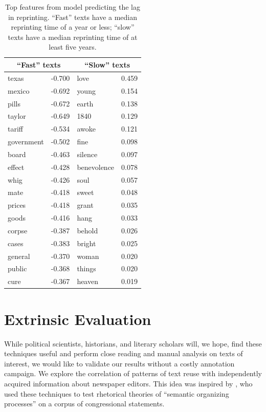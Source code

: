 \documentclass[pdftex,11pt]{article}
\begin{document}
\begin{table}
  \small
  \centering
  \caption{Top features from model predicting the lag in
    reprinting.  ``Fast'' texts have a median reprinting time of a
    year or less; ``slow'' texts have a median reprinting time of at
    least five years.}
  \label{tab:lag-features}
  \begin{tabular}{l r|l r}
\multicolumn{2}{c|}{``Fast'' texts} &
\multicolumn{2}{c}{``Slow'' texts} \\ \hline
texas & -0.700 & love & 0.459\\
mexico & -0.692 & young & 0.154\\
pills & -0.672 & earth & 0.138\\
taylor & -0.649 & 1840 & 0.129\\
tariff & -0.534 & awoke & 0.121\\
government & -0.502 & fine & 0.098\\
board & -0.463 & silence & 0.097\\
effect & -0.428 & benevolence & 0.078\\
whig & -0.426 & soul & 0.057\\
mate & -0.418 & sweet & 0.048\\
prices & -0.418 & grant & 0.035\\
goods & -0.416 & hang & 0.033\\
corpse & -0.387 & behold & 0.026\\
cases & -0.383 & bright & 0.025 \\
general & -0.370 & woman & 0.020\\
public & -0.368 & things & 0.020\\
cure & -0.367 & heaven & 0.019\\
  \end{tabular}
\end{table}

\section{Extrinsic Evaluation}
\label{sec:extrinsic}

While political scientists, historians, and literary scholars will, we
hope, find these techniques useful and perform close reading and
manual analysis on texts of interest, we would like to validate our
results without a costly annotation campaign.  We explore the
correlation of patterns of text reuse with independently acquired
information about newspaper editors.  This idea was inspired by
\cite{margolin13:_why_simil}, who used these techniques to test
rhetorical theories of ``semantic organizing processes'' on a corpus
of congressional statements.
\end{document}
